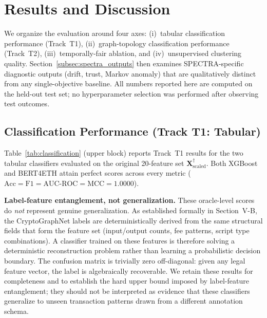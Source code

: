 %
%

\section{Results and Discussion}
\label{sec:results}

We organize the evaluation around four axes:
(i)~tabular classification performance (Track~T1),
(ii)~graph-topology classification performance (Track~T2),
(iii)~temporally-fair ablation, and
(iv)~unsupervised clustering quality.
Section~\ref{subsec:spectra_outputs} then examines SPECTRA-specific
diagnostic outputs (drift, trust, Markov anomaly) that are qualitatively
distinct from any single-objective baseline.
All numbers reported here are computed on the held-out test set;
no hyperparameter selection was performed after observing test outcomes.


\subsection{Classification Performance (Track T1: Tabular)}
\label{subsec:t1_results}

Table~\ref{tab:classification} (upper block) reports Track~T1 results for
the two tabular classifiers evaluated on the original \num{20}-feature set
$\mathbf{X}^{\dagger}_{\text{scaled}}$.
Both XGBoost and BERT4ETH attain perfect scores across every metric
($\text{Acc} = \text{F1} = \text{AUC-ROC} = \text{MCC} = \num{1.0000}$).

\textbf{Label-feature entanglement, not generalization.}
These oracle-level scores do \emph{not} represent genuine generalization.
As established formally in Section~V-B, the CryptoGraphNet labels are
deterministically derived from the same structural fields that form the
feature set (input/output counts, fee patterns, script type combinations).
A classifier trained on these features is therefore solving a
deterministic reconstruction problem rather than learning a probabilistic
decision boundary.
The confusion matrix is trivially zero off-diagonal: given any legal feature
vector, the label is algebraically recoverable.
We retain these results for completeness and to establish the hard upper
bound imposed by label-feature entanglement; they should not be interpreted
as evidence that these classifiers generalize to unseen transaction patterns
drawn from a different annotation schema.

